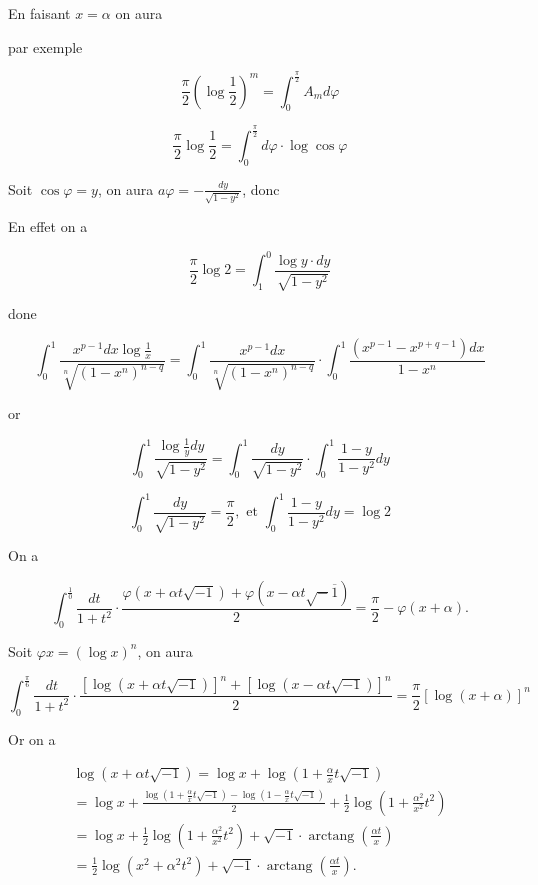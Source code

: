\documentclass{article}
\begin{document}
En faisant \(x=\alpha\) on aura

par exemple

\[
\frac{\pi}{2}\left(\log \frac{1}{2}\right)^{m}=\int_{0}^{\frac{\pi}{2}} A_{m} d \varphi
\]

\[
\frac{\pi}{2} \log \frac{1}{2}=\int_{0}^{\frac{\pi}{2}} d \varphi \cdot \log \cos \varphi
\]

Soit \(\cos \varphi=y\), on aura \(a \varphi=-\frac{d y}{\sqrt{1-y^{2}}}\), donc

En effet on a

\[
\frac{\pi}{2} \log 2=\int_{1}^{0} \frac{\log y \cdot d y}{\sqrt{1-y^{2}}}
\]

done

\[
\int_{0}^{1} \frac{x^{p-1} d x \log \frac{1}{x}}{\sqrt[n]{\left(1-x^{n}\right)^{n-q}}}=\int_{0}^{1} \frac{x^{p-1} d x}{\sqrt[n]{\left(1-x^{n}\right)^{n-q}}} \cdot \int_{0}^{1} \frac{\left(x^{p-1}-x^{p+q-1}\right) d x}{1-x^{n}}
\]

or

\[
\int_{0}^{1} \frac{\log \frac{1}{y} d y}{\sqrt{1-y^{2}}}=\int_{0}^{1} \frac{d y}{\sqrt{1-y^{2}}} \cdot \int_{0}^{1} \frac{1-y}{1-y^{2}} d y
\]

\[
\int_{0}^{1} \frac{d y}{\sqrt{1-y^{2}}}=\frac{\pi}{2}, \text { et } \int_{0}^{1} \frac{1-y}{1-y^{2}} d y=\log 2
\]

On a

\[
\int_{0}^{\frac{1}{0}} \frac{d t}{1+t^{2}} \cdot \frac{\varphi(x+\alpha t \sqrt{-1})+\varphi(x-\alpha t \sqrt{-} \overline{1})}{2}=\frac{\pi}{2}-\varphi(x+\alpha) .
\]

Soit \(\varphi x=(\log x)^{n}\), on aura

\[
\int_{0}^{\frac{\pi}{6}} \frac{d t}{1+t^{2}} \cdot \frac{[\log (x+\alpha t \sqrt{-1})]^{n}+[\log (x-\alpha t \sqrt{-1})]^{n}}{2}=\frac{\pi}{2}[\log (x+\alpha)]^{n}
\]

Or on a

\[
\begin{gathered}
\log (x+\alpha t \sqrt{-1})=\log x+\log \left(1+\frac{\alpha}{x} t \sqrt{-1}\right) \\
=\log x+\frac{\log \left(1+\frac{\alpha}{x} t \sqrt{-1}\right)-\log \left(1-\frac{\alpha}{x} t \sqrt{-1}\right)}{2}+\frac{1}{2} \log \left(1+\frac{\alpha^{2}}{x^{2}} t^{2}\right) \\
=\log x+\frac{1}{2} \log \left(1+\frac{\alpha^{2}}{x^{2}} t^{2}\right)+\sqrt{-1} \cdot \operatorname{arctang}\left(\frac{\alpha t}{x}\right) \\
=\frac{1}{2} \log \left(x^{2}+\alpha^{2} t^{2}\right)+\sqrt{-1} \cdot \operatorname{arctang}\left(\frac{\alpha t}{x}\right) .
\end{gathered}
\]
\end{document}
